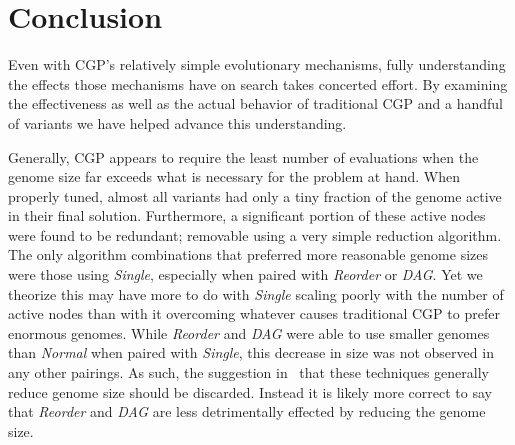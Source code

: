 \documentclass[journal]{IEEEtran}
\begin{document}
%





\section{Conclusion}
\label{sec:conclusion}
Even with CGP's relatively simple evolutionary mechanisms, fully understanding
the effects those mechanisms have on search takes concerted effort.  By examining
the effectiveness as well as the actual behavior of traditional CGP and
a handful of variants we have helped advance this understanding.

Generally, CGP appears to require the least number of evaluations when the genome
size far exceeds what is necessary for the problem at hand.  When properly tuned,
almost all variants had only a tiny fraction of the genome active in their final
solution.  Furthermore, a significant portion of these active nodes were found
to be redundant; removable using a very simple reduction algorithm.  The only
algorithm combinations that preferred more reasonable genome sizes were those using \emph{Single},
especially when paired with \emph{Reorder} or \emph{DAG}.  Yet we theorize this may
have more to do with \emph{Single} scaling poorly with the number of active nodes
than with it overcoming whatever causes traditional CGP to prefer enormous genomes.
While \emph{Reorder} and \emph{DAG} were able to use smaller genomes than \emph{Normal}
when paired with \emph{Single}, this decrease in size was not observed in any other
pairings.  As such, the suggestion in~\cite{goldman:2013:ordering} that these
techniques generally reduce genome size should be discarded.  Instead it is likely
more correct to say that \emph{Reorder} and \emph{DAG} are less detrimentally effected
by reducing the genome size.
\end{document}
